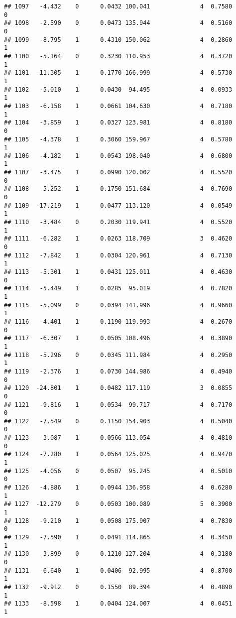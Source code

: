 \documentclass[
]{article}
\begin{document}
\begin{verbatim}
## 1097   -4.432    0      0.0432 100.041              4  0.7580      0
## 1098   -2.590    0      0.0473 135.944              4  0.5160      0
## 1099   -8.795    1      0.4310 150.062              4  0.2860      1
## 1100   -5.164    0      0.3230 110.953              4  0.3720      1
## 1101  -11.305    1      0.1770 166.999              4  0.5730      1
## 1102   -5.010    1      0.0430  94.495              4  0.0933      1
## 1103   -6.158    1      0.0661 104.630              4  0.7180      1
## 1104   -3.859    1      0.0327 123.981              4  0.8180      0
## 1105   -4.378    1      0.3060 159.967              4  0.5780      1
## 1106   -4.182    1      0.0543 198.040              4  0.6800      1
## 1107   -3.475    1      0.0990 120.002              4  0.5520      0
## 1108   -5.252    1      0.1750 151.684              4  0.7690      0
## 1109  -17.219    1      0.0477 113.120              4  0.0549      1
## 1110   -3.484    0      0.2030 119.941              4  0.5520      1
## 1111   -6.282    1      0.0263 118.709              3  0.4620      0
## 1112   -7.842    1      0.0304 120.961              4  0.7130      1
## 1113   -5.301    1      0.0431 125.011              4  0.4630      0
## 1114   -5.449    1      0.0285  95.019              4  0.7820      1
## 1115   -5.099    0      0.0394 141.996              4  0.9660      1
## 1116   -4.401    1      0.1190 119.993              4  0.2670      0
## 1117   -6.307    1      0.0505 108.496              4  0.3890      1
## 1118   -5.296    0      0.0345 111.984              4  0.2950      1
## 1119   -2.376    1      0.0730 144.986              4  0.4940      0
## 1120  -24.801    1      0.0482 117.119              3  0.0855      0
## 1121   -9.816    1      0.0534  99.717              4  0.7170      0
## 1122   -7.549    0      0.1150 154.903              4  0.5040      0
## 1123   -3.087    1      0.0566 113.054              4  0.4810      0
## 1124   -7.280    1      0.0564 125.025              4  0.9470      1
## 1125   -4.056    0      0.0507  95.245              4  0.5010      0
## 1126   -4.886    1      0.0944 136.958              4  0.6280      1
## 1127  -12.279    0      0.0503 100.089              5  0.3900      1
## 1128   -9.210    1      0.0508 175.907              4  0.7830      0
## 1129   -7.590    1      0.0491 114.865              4  0.3450      1
## 1130   -3.899    0      0.1210 127.204              4  0.3180      0
## 1131   -6.640    1      0.0406  92.995              4  0.8700      1
## 1132   -9.912    0      0.1550  89.394              4  0.4890      1
## 1133   -8.598    1      0.0404 124.007              4  0.0451      1

\end{verbatim}
\end{document}
